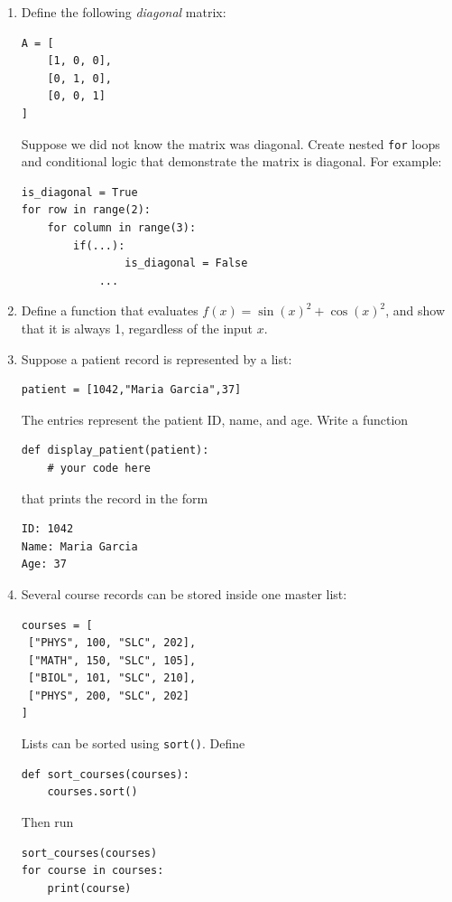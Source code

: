 \documentclass{article}
\begin{document}
\begin{enumerate}
\begin{verbatim}
score = int(input("Score: "))
sub = input("Submitted? yes/no: ") == "yes"
att = input("Attendance OK? yes/no: ") == "yes"
\end{verbatim}
Create the Boolean variable
\begin{verbatim}
ready = sub and att
\end{verbatim}
and use it in the following chained decision:
\begin{verbatim}
if score >= 90 and ready:
    print("Excellent")
elif score >= 70 and ready:
    print("Pass")
elif not sub or not att:
    print("Incomplete")
else:
    print("Revise")
\end{verbatim}
Run the program several times.  Find inputs that cause each of the four branches to execute.
\item Define the following \textit{diagonal} matrix:
\begin{verbatim}
A = [
    [1, 0, 0],
    [0, 1, 0],
    [0, 0, 1]
]
\end{verbatim}
Suppose we did not know the matrix was diagonal.  Create nested \verb+for+ loops and conditional logic that demonstrate the matrix is diagonal.  For example:
\begin{verbatim}
is_diagonal = True
for row in range(2):
    for column in range(3):
        if(...):
        		is_diagonal = False
        	...
\end{verbatim}
\item Define a function that evaluates $f(x) = \sin(x)^2 + \cos(x)^2$, and show that it is always 1, regardless of the input $x$.
\item Suppose a patient record is represented by a list:
\begin{verbatim}
patient = [1042,"Maria Garcia",37]
\end{verbatim}
The entries represent the patient ID, name, and age. Write a function
\begin{verbatim}
def display_patient(patient):
    # your code here
\end{verbatim}
that prints the record in the form
\begin{verbatim}
ID: 1042
Name: Maria Garcia
Age: 37
\end{verbatim}
\item Several course records can be stored inside one master list:
\begin{verbatim}
courses = [
 ["PHYS", 100, "SLC", 202],
 ["MATH", 150, "SLC", 105],
 ["BIOL", 101, "SLC", 210],
 ["PHYS", 200, "SLC", 202]
]
\end{verbatim}
Lists can be sorted using \texttt{sort()}. Define
\begin{verbatim}
def sort_courses(courses):
    courses.sort()
\end{verbatim}
Then run
\begin{verbatim}
sort_courses(courses)
for course in courses:
    print(course)
\end{verbatim}
\end{enumerate}
\end{document}
